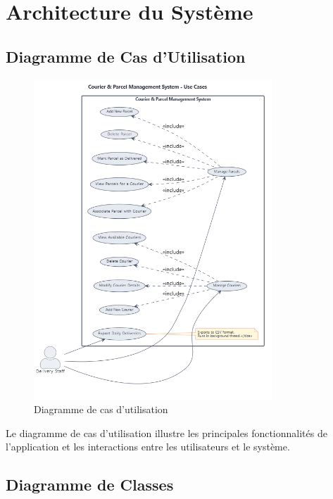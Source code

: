 \documentclass{rapportENSIAS}
\begin{document}
\section{Architecture du Syst\`{e}me}

\subsection{Diagramme de Cas d'Utilisation}

\begin{figure}[H]
    \centering
    \includegraphics[width=0.8\textwidth]{UseCase Diagram.png}
    \caption{Diagramme de cas d'utilisation}
    \label{fig:usecase}
\end{figure}

Le diagramme de cas d'utilisation illustre les principales fonctionnalit\'{e}s de l'application et les interactions entre les utilisateurs et le syst\`{e}me.

\subsection{Diagramme de Classes}
\end{document}
